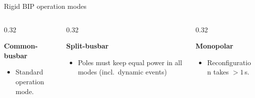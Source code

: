 \begin{frame}{Rigid BIP operation modes}
  \begin{columns}[T,onlytextwidth]
    \begin{column}{0.32\textwidth}\centering
      \\[0.3em]
      {\footnotesize\textbf{Common-busbar}\\ 
      \begin{itemize}
        \item Standard operation mode.
      \end{itemize}
      }
    \end{column}
    \begin{column}{0.32\textwidth}\centering
      \\[0.3em]
      {\footnotesize\textbf{Split-busbar}\\
      \begin{itemize}
        \item Poles must keep equal power in all modes (incl.\ dynamic events)
      \end{itemize}
      }
    \end{column}
    \begin{column}{0.32\textwidth}\centering
      \\[0.3em]
      {\footnotesize\textbf{Monopolar}\\
      \begin{itemize}
        \item Reconfiguration takes $>1$\,s.
      \end{itemize}
      }
    \end{column}
  \end{columns}
\end{frame}

